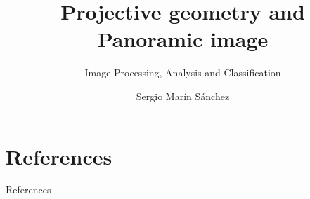 \documentclass[xcolor=table]{beamer}
\title{Projective geometry and Panoramic image}
\subtitle{Image Processing, Analysis and Classification}
\author{Sergio Marín Sánchez}
\date{\displaydate{date}}
\begin{document}
\thispagestyle{empty}

\maketitle











\section{References}

\begin{frame}[allowframebreaks]{References}
    \nocite{*}
    \printbibliography
\end{frame}
\end{document}
